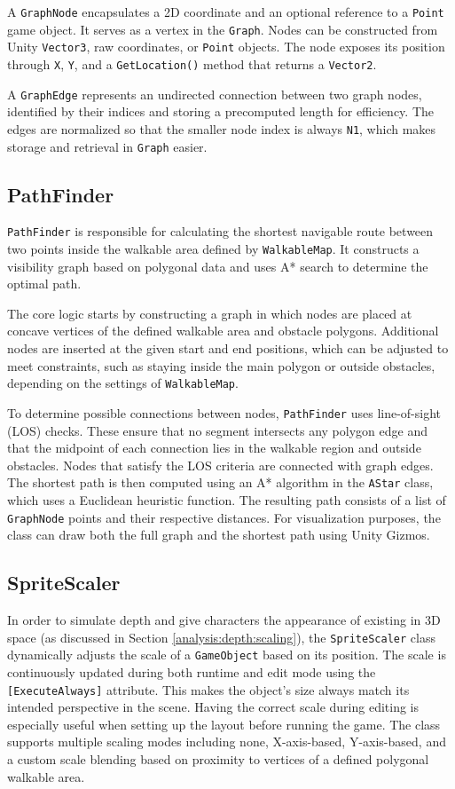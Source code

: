  A \verb|GraphNode| encapsulates a 2D coordinate and an optional reference to a \verb|Point| game object. It serves as a vertex in the \verb|Graph|. Nodes can be constructed from Unity \verb|Vector3|, raw coordinates, or \verb|Point| objects. The node exposes its position through \verb|X|, \verb|Y|, and a \verb|GetLocation()| method that returns a \verb|Vector2|.

 A \verb|GraphEdge| represents an undirected connection between two graph nodes, identified by their indices and storing a precomputed length for efficiency. The edges are normalized so that the smaller node index is always \verb|N1|, which makes storage and retrieval in \verb|Graph| easier.


\subsection{PathFinder}
\verb|PathFinder| is responsible for calculating the shortest navigable route between two points inside the walkable area defined by \verb|WalkableMap|. It constructs a visibility graph based on polygonal data and uses A* search to determine the optimal path.

The core logic starts by constructing a graph in which nodes are placed at concave vertices of the defined walkable area and obstacle polygons. Additional nodes are inserted at the given start and end positions, which can be adjusted to meet constraints, such as staying inside the main polygon or outside obstacles, depending on the settings of \verb|WalkableMap|.

To determine possible connections between nodes, \verb|PathFinder| uses line-of-sight (LOS) checks. These ensure that no segment intersects any polygon edge and that the midpoint of each connection lies in the walkable region and outside obstacles. Nodes that satisfy the LOS criteria are connected with graph edges. The shortest path is then computed using an A* algorithm in the \verb|AStar| class, which uses a Euclidean heuristic function.  The resulting path consists of a list of \verb|GraphNode| points and their respective distances. For visualization purposes, the class can draw both the full graph and the shortest path using Unity Gizmos.



\subsection{SpriteScaler}
In order to simulate depth and give characters the appearance of existing in 3D space (as discussed in Section \ref{analysis:depth:scaling}), the \verb|SpriteScaler| class dynamically adjusts the scale of a \verb|GameObject| based on its position.  The scale is continuously updated during both runtime and edit mode using the \verb|[ExecuteAlways]| attribute. This makes the object's size always match its intended perspective in the scene. Having the correct scale during editing is especially useful when setting up the layout before running the game. The class supports multiple scaling modes including none, X-axis-based, Y-axis-based, and a custom scale blending based on proximity to vertices of a defined polygonal walkable area.

